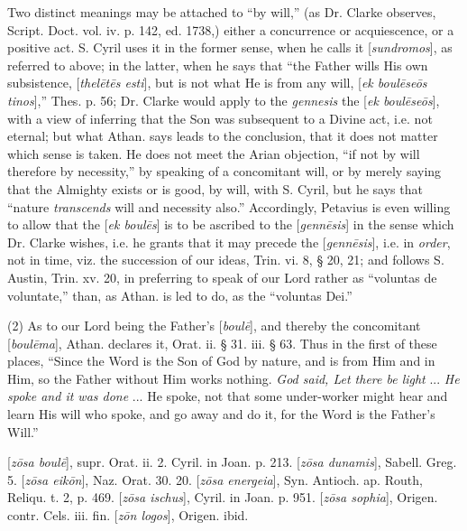 Two distinct meanings may be attached to “by
will,” (as Dr. Clarke observes, Script. Doct. vol. iv. p. 142, ed.
1738,) either a concurrence or acquiescence, or a positive act. S.
Cyril uses it in the former sense, when he calls it [\emph{sundromos}],
as referred to above; in the latter, when he says that “the Father
wills His own subsistence, [\emph{thel\={e}t\={e}s esti}], but
is not what He is from any will, [\emph{ek boul\={e}se\={o}s tinos}],”
Thes. p. 56; Dr. Clarke would apply to the \emph{gennesis} the [\emph{ek
boul\={e}se\={o}s}], with a view of inferring that the Son
was subsequent to a Divine act, i.e. not eternal; but what Athan. says
leads to the conclusion, that it does not matter which sense is taken.
He does not meet the Arian objection, “if not by will therefore by
necessity,” by speaking of a concomitant will, or by merely saying
that the Almighty exists or is good, by will, with S. Cyril, but he
says that “nature \emph{transcends} will and necessity also.”
Accordingly, Petavius is even willing to allow that the [\emph{ek boul\={e}s}]
is to be ascribed to the [\emph{genn\={e}sis}] in the sense which
Dr. Clarke wishes, i.e. he grants that it may precede the [\emph{genn\={e}sis}],
i.e. in \emph{order}, not in time, viz. the succession of our ideas,
Trin. vi. 8, § 20, 21; and follows S. Austin, Trin. xv. 20, in
preferring to speak of our Lord rather as “voluntas de voluntate,”
than, as Athan. is led to do, as the “voluntas Dei.”

(2) As to our Lord being the Father’s [\emph{boul\={e}}],
and thereby the concomitant [\emph{boul\={e}ma}], Athan. declares
it, Orat. ii. § 31. iii. § 63. Thus in the first of these places, “Since the Word is the Son of God by nature, and is from Him
and in Him, so the Father without Him works nothing. \emph{God said, Let
there be light} ... \emph{He spoke and it was done} ... He spoke,
not that some under-worker might hear and learn His will who spoke,
and go away and do it, for the Word is the Father’s Will.”

[\emph{z\={o}sa boul\={e}}], supr. Orat.
ii. 2. Cyril. in Joan. p. 213. [\emph{z\={o}sa dunamis}], Sabell.
Greg. 5. [\emph{z\={o}sa eik\={o}n}], Naz. Orat. 30. 20. [\emph{z\={o}sa
energeia}], Syn. Antioch. ap. Routh, Reliqu. t. 2, p. 469. [\emph{z\={o}sa
ischus}], Cyril. in Joan. p. 951. [\emph{z\={o}sa sophia}],
Origen. contr. Cels. iii. fin. [\emph{z\={o}n logos}], Origen.
ibid.

